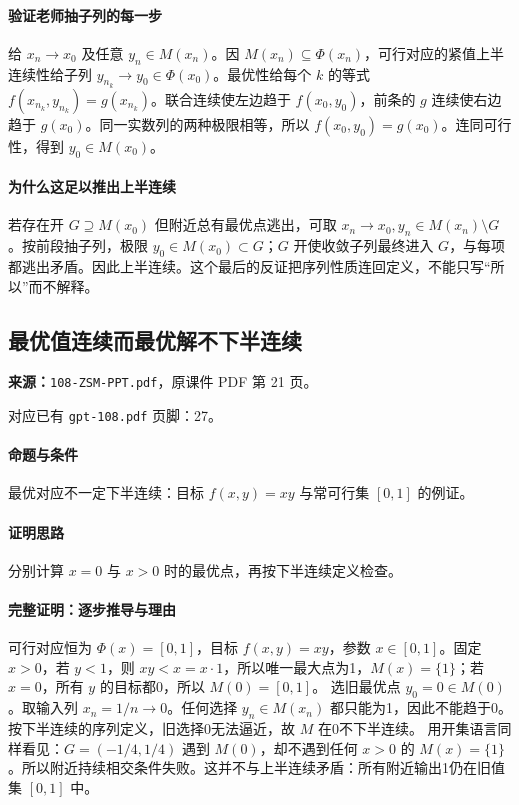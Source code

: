 \paragraph{验证老师抽子列的每一步}给 $x_n\to x_0$ 及任意 $y_n\in M(x_n)$。因 $M(x_n)\subseteq\Phi(x_n)$，可行对应的紧值上半连续性给子列 $y_{n_k}\to y_0\in\Phi(x_0)$。最优性给每个 $k$ 的等式 $f(x_{n_k},y_{n_k})=g(x_{n_k})$。联合连续使左边趋于 $f(x_0,y_0)$，前条的 $g$ 连续使右边趋于 $g(x_0)$。同一实数列的两种极限相等，所以 $f(x_0,y_0)=g(x_0)$。连同可行性，得到 $y_0\in M(x_0)$。
\paragraph{为什么这足以推出上半连续}若存在开 $G\supseteq M(x_0)$ 但附近总有最优点逃出，可取 $x_n\to x_0,y_n\in M(x_n)\setminus G$。按前段抽子列，极限 $y_0\in M(x_0)\subset G$；$G$ 开使收敛子列最终进入 $G$，与每项都逃出矛盾。因此上半连续。这个最后的反证把序列性质连回定义，不能只写“所以”而不解释。

\clearpage\subsection{最优值连续而最优解不下半连续}
\textbf{来源：}\texttt{108-ZSM-PPT.pdf}，原课件 PDF 第 21 页。\par
对应已有 \texttt{gpt-108.pdf} 页脚：27。\par
\paragraph{命题与条件}最优对应不一定下半连续：目标 $f(x,y)=xy$ 与常可行集 $[0,1]$ 的例证。
\paragraph{证明思路}分别计算 $x=0$ 与 $x>0$ 时的最优点，再按下半连续定义检查。
\paragraph{完整证明：逐步推导与理由}

可行对应恒为 $\Phi(x)=[0,1]$，目标 $f(x,y)=xy$，参数 $x\in[0,1]$。固定 $x>0$，若 $y<1$，则 $xy<x=x\cdot1$，所以唯一最大点为1，$M(x)=\{1\}$；若 $x=0$，所有 $y$ 的目标都0，所以 $M(0)=[0,1]$。
选旧最优点 $y_0=0\in M(0)$。取输入列 $x_n=1/n\to0$。任何选择 $y_n\in M(x_n)$ 都只能为1，因此不能趋于0。按下半连续的序列定义，旧选择0无法逼近，故 $M$ 在0不下半连续。
用开集语言同样看见：$G=(-1/4,1/4)$ 遇到 $M(0)$，却不遇到任何 $x>0$ 的 $M(x)=\{1\}$。所以附近持续相交条件失败。这并不与上半连续矛盾：所有附近输出1仍在旧值集 $[0,1]$ 中。

